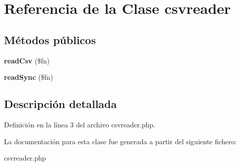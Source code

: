 \hypertarget{classcsvreader}{\section{\-Referencia de la \-Clase csvreader}
\label{classcsvreader}
}
\subsection*{\-Métodos públicos}
\begin{DoxyCompactItemize}
\item 
\hypertarget{classcsvreader_aa452a501204476ec83163c625a75e709}{{\bfseries read\-Csv} (\$fn)}\label{classcsvreader_aa452a501204476ec83163c625a75e709}

\item 
\hypertarget{classcsvreader_a0dcd4aba99b7cfc585420b96bc3e8618}{{\bfseries read\-Sync} (\$fn)}\label{classcsvreader_a0dcd4aba99b7cfc585420b96bc3e8618}

\end{DoxyCompactItemize}


\subsection{\-Descripción detallada}


\-Definición en la línea 3 del archivo csvreader.\-php.



\-La documentación para esta clase fue generada a partir del siguiente fichero\-:\begin{DoxyCompactItemize}
\item 
csvreader.\-php\end{DoxyCompactItemize}
